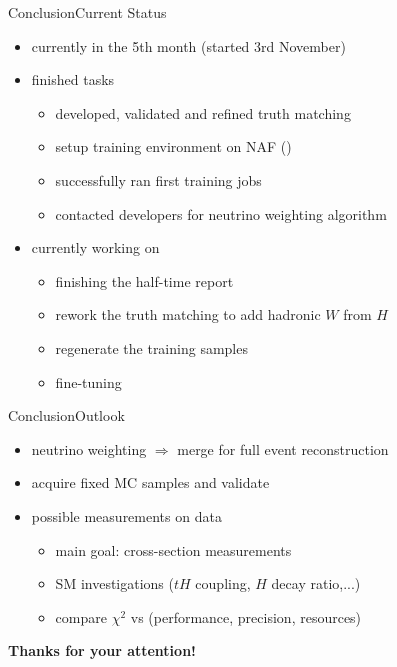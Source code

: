 \documentclass[9pt, aspectratio=169]{beamer}
\begin{document}
\begin{frame}{Conclusion}{Current Status}
	\begin{itemize}
		\item currently in the 5th month (started 3rd November)
		\item finished tasks
		\begin{itemize}
			\item developed, validated and refined truth matching
			\item setup training environment on NAF (\desy)
			\item successfully ran first \spanet training jobs
			\item contacted developers for neutrino weighting algorithm
		\end{itemize}
		\item currently working on
		\begin{itemize}
			\item finishing the half-time report
			\item rework the truth matching to add hadronic $W$ from $H$
			\item regenerate the training samples 
			\item fine-tuning \spanet
		\end{itemize}
	\end{itemize}
\end{frame}

\begin{frame}{Conclusion}{Outlook}
	\begin{itemize}
      	\item neutrino weighting $\Rightarrow$ merge for full event reconstruction
      	\item acquire fixed MC samples and validate
      	\item possible measurements on data
			\begin{itemize}
				\item main goal: cross-section measurements
				\item SM investigations ($tH$ coupling, $H$ decay ratio,...)
				\item compare $\chi^2$ vs \spanet (performance, precision, resources)
			\end{itemize}
	\end{itemize}
	
	\vspace{10mm}

	\begin{center}
    	\color{highlighter}\textbf{\LARGE Thanks for your attention!}
  	\end{center}
\end{frame}
\end{document}
